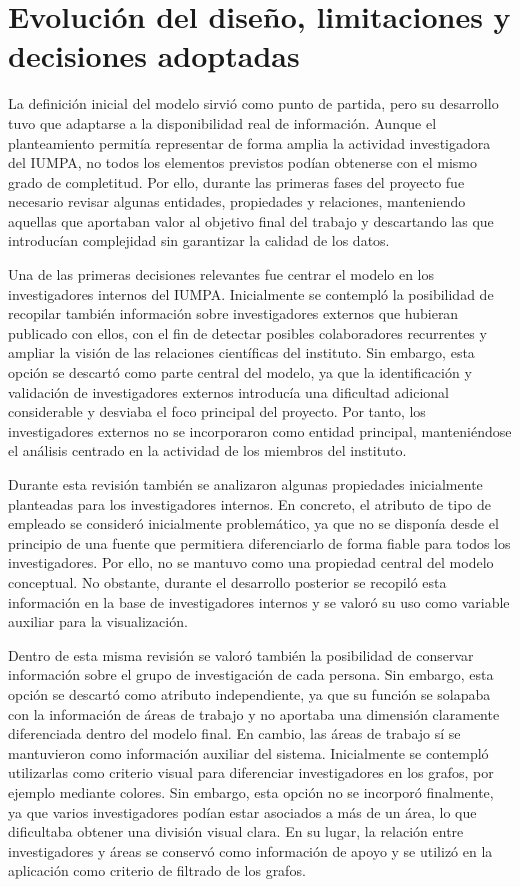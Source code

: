 \documentclass[11pt,spanish,listoffigures,listoftables]{tfgetsinf}
\begin{document}
\section{Evolución del diseño, limitaciones y decisiones adoptadas}

La definición inicial del modelo sirvió como punto de partida, pero su desarrollo tuvo que adaptarse a la disponibilidad real de información. Aunque el planteamiento permitía representar de forma amplia la actividad investigadora del IUMPA, no todos los elementos previstos podían obtenerse con el mismo grado de completitud. Por ello, durante las primeras fases del proyecto fue necesario revisar algunas entidades, propiedades y relaciones, manteniendo aquellas que aportaban valor al objetivo final del trabajo y descartando las que introducían complejidad sin garantizar la calidad de los datos.

Una de las primeras decisiones relevantes fue centrar el modelo en los investigadores internos del IUMPA. Inicialmente se contempló la posibilidad de recopilar también información sobre investigadores externos que hubieran publicado con ellos, con el fin de detectar posibles colaboradores recurrentes y ampliar la visión de las relaciones científicas del instituto. Sin embargo, esta opción se descartó como parte central del modelo, ya que la identificación y validación de investigadores externos introducía una dificultad adicional considerable y desviaba el foco principal del proyecto. Por tanto, los investigadores externos no se incorporaron como entidad principal, manteniéndose el análisis centrado en la actividad de los miembros del instituto.

Durante esta revisión también se analizaron algunas propiedades inicialmente planteadas para los investigadores internos. En concreto, el atributo de tipo de empleado se consideró inicialmente problemático, ya que no se disponía desde el principio de una fuente que permitiera diferenciarlo de forma fiable para todos los investigadores. Por ello, no se mantuvo como una propiedad central del modelo conceptual. No obstante, durante el desarrollo posterior se recopiló esta información en la base de investigadores internos y se valoró su uso como variable auxiliar para la visualización.

Dentro de esta misma revisión se valoró también la posibilidad de conservar información sobre el grupo de investigación de cada persona. Sin embargo, esta opción se descartó como atributo independiente, ya que su función se solapaba con la información de áreas de trabajo y no aportaba una dimensión claramente diferenciada dentro del modelo final. En cambio, las áreas de trabajo sí se mantuvieron como información auxiliar del sistema. Inicialmente se contempló utilizarlas como criterio visual para diferenciar investigadores en los grafos, por ejemplo mediante colores. Sin embargo, esta opción no se incorporó finalmente, ya que varios investigadores podían estar asociados a más de un área, lo que dificultaba obtener una división visual clara. En su lugar, la relación entre investigadores y áreas se conservó como información de apoyo y se utilizó en la aplicación como criterio de filtrado de los grafos.
\end{document}
